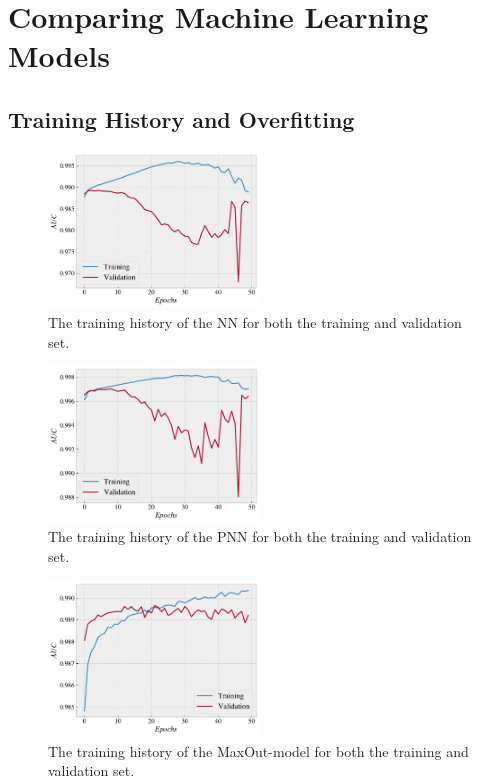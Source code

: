 \section{Comparing Machine Learning Models}
\subsection{Training History and Overfitting}
\begin{figure}
    \centering
    \includegraphics[width=0.5\textwidth]{Figures/MLResults/NN/SUSY/History/NNHistory.pdf}
    \caption{The training history of the \ac{NN} for both the training and validation set.}
    \label{fig:NNHist}
\end{figure}
\begin{figure}
    \centering
    \includegraphics[width=0.5\textwidth]{Figures/MLResults/NN/SUSY/History/PNNHistory.pdf}
    \caption{The training history of the \ac{PNN} for both the training and validation set.}
    \label{fig:PNNHist}
\end{figure}

\begin{figure}
    \centering
    \includegraphics[width=0.5\textwidth]{Figures/MLResults/NN/SUSY/History/MaxOutHistory.pdf}
    \caption{The training history of the MaxOut-model for both the training and validation set.}
    \label{fig:MaxOutHist}
\end{figure}

